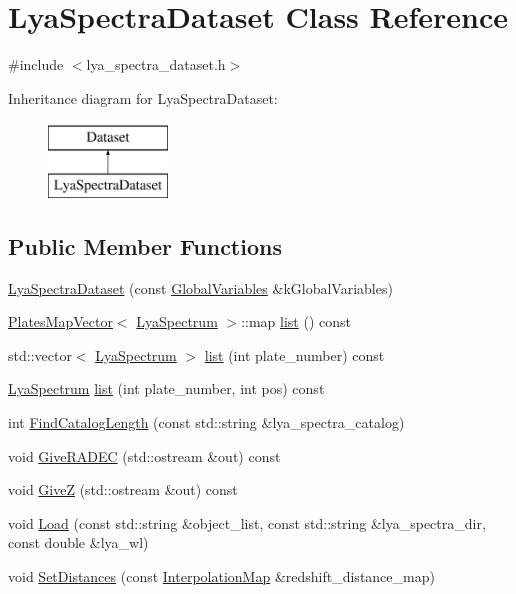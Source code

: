 \hypertarget{class_lya_spectra_dataset}{\section{Lya\-Spectra\-Dataset Class Reference}
\label{class_lya_spectra_dataset}
}


{\ttfamily \#include $<$lya\-\_\-spectra\-\_\-dataset.\-h$>$}

Inheritance diagram for Lya\-Spectra\-Dataset\-:\begin{figure}[H]
\begin{center}
\leavevmode
\includegraphics[height=2.000000cm]{class_lya_spectra_dataset}
\end{center}
\end{figure}
\subsection*{Public Member Functions}
\begin{DoxyCompactItemize}
\item 
\hyperlink{class_lya_spectra_dataset_ae9259d54f1bdf5f8b3672a60bbfcd8e6}{Lya\-Spectra\-Dataset} (const \hyperlink{class_global_variables}{Global\-Variables} \&k\-Global\-Variables)
\item 
\hyperlink{struct_plates_map_vector}{Plates\-Map\-Vector}$<$ \hyperlink{class_lya_spectrum}{Lya\-Spectrum} $>$\-::map \hyperlink{class_lya_spectra_dataset_a7b3cef8f52440561301354331230ae95}{list} () const 
\item 
std\-::vector$<$ \hyperlink{class_lya_spectrum}{Lya\-Spectrum} $>$ \hyperlink{class_lya_spectra_dataset_a823b1542931d028564c59fc48da8f7dc}{list} (int plate\-\_\-number) const 
\item 
\hyperlink{class_lya_spectrum}{Lya\-Spectrum} \hyperlink{class_lya_spectra_dataset_a03b47e3cb5016ab62c8916ae1f9f980d}{list} (int plate\-\_\-number, int pos) const 
\item 
int \hyperlink{class_lya_spectra_dataset_a0b10efda4e299ffb8d8ddce45bebfaa9}{Find\-Catalog\-Length} (const std\-::string \&lya\-\_\-spectra\-\_\-catalog)
\item 
void \hyperlink{class_lya_spectra_dataset_a29aa2c3f113d6cbc9d10bfabad12362d}{Give\-R\-A\-D\-E\-C} (std\-::ostream \&out) const 
\item 
void \hyperlink{class_lya_spectra_dataset_a859711c028a33cf935ca5a5a3fb480fd}{Give\-Z} (std\-::ostream \&out) const 
\item 
void \hyperlink{class_lya_spectra_dataset_a85930fd54f392cbfcbea7f49a80b5916}{Load} (const std\-::string \&object\-\_\-list, const std\-::string \&lya\-\_\-spectra\-\_\-dir, const double \&lya\-\_\-wl)
\item 
void \hyperlink{class_lya_spectra_dataset_a444d22db8e799457aef351e74107802e}{Set\-Distances} (const \hyperlink{class_interpolation_map}{Interpolation\-Map} \&redshift\-\_\-distance\-\_\-map)
\end{DoxyCompactItemize}


